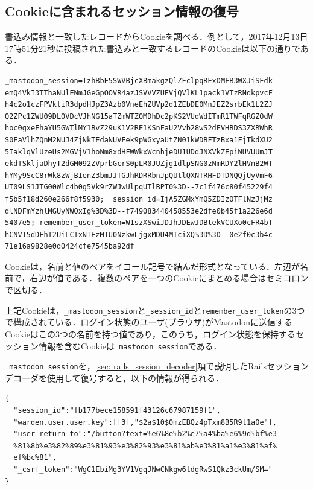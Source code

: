 \documentclass[10pt, a4paper]{jreport}
\begin{document}
\subsection{Cookieに含まれるセッション情報の復号}
書込み情報と一致したレコードからCookieを調べる．例として，2017年12月13日17時51分21秒に投稿された書込みと一致するレコードのCookieは以下の通りである．

\begin{verbatim}
_mastodon_session=TzhBbE5SWVBjcXBmakgzQlZFclpqRExDMFB3WXJiSFdk
emQ4VkI3TThaNUlENmJGeGpOOVR4azJSVVVZUFVjQVlKL1pack1VTzRNdkpvcF
h4c2o1czFPVkliR3dpdHJpZ3Azb0VneEhZUVp2d1ZEbDE0MnJEZ2srbEk1L2ZJ
Q2ZPc1ZWU09DL0VDcVJhNG15aTZmWTZQMDhDc2pKS2VUdWdITmR1TWFqRGZOdW
hoc0gxeFhaYU5GWTlMY1BvZ29uK1V2RE1KSnFaU2Vvb28wS2dFVHBDS3ZXRWhR
S0FaVlhZQnM2NUJ4ZjNkTEdaNUVFek9pWGxyaUtZN01kWDBFTzBxa1FjTkdXU2
5IaklqVlUzeUs2MGVjV1hoNm8xdHFWWkxWcnhjeDU1UDdJNXVkZEpiNUVUUmJT
ekdTSkljaDhyT2dGM092ZVprbGcrS0pLR0JUZjg1dlpSNG0zNmRDY2lHVnB2WT
hYMy9ScC8rWk8zWjBIenZ3bmJJTGJhRDRRbnJpQUtlQXNTRHFDTDNQQjUyVmF6
UT09LS1JTG00Wlc4b0g5Vk9rZWJwUlpqUTlBPT0%3D--7c1f476c80f45229f4
f5b5f18d260e266f8f5930; _session_id=IjA5ZGMxYmQ5ZDIzOTFlNzJjMz
dlNDFmYzhlMGUyNWQxIg%3D%3D--f749083440458553e2dfe0b45f1a226e6d
5407e5; remember_user_token=W1szXSwiJDJhJDEwJDBtekVCUXo0cFR4bT
hCNVI5dDFhT2UiLCIxNTEzMTU0NzkwLjgxMDU4MTciXQ%3D%3D--0e2f0c3b4c
71e16a9828e0d0424cfe7545ba92df
\end{verbatim}

Cookieは，名前と値のペアをイコール記号で結んだ形式となっている．左辺が名前で，右辺が値である．複数のペアを一つのCookieにまとめる場合はセミコロンで区切る．

上記Cookieは，\verb|_mastodon_session|と\verb|_session_id|と\verb|remember_user_token|の3つで構成されている．ログイン状態のユーザ(ブラウザ)がMastodonに送信するCookieはこの3つの名前を持つ値であり，このうち，ログイン状態を保持するセッション情報を含むCookieは\verb|_mastodon_session|である．

\verb|_mastodon_session|を，\ref{sec: rails_session_decoder}項で説明したRailsセッションデコーダを使用して復号すると，以下の情報が得られる．

\begin{verbatim}
{
  "session_id":"fb177bece158591f43126c67987159f1",
  "warden.user.user.key":[[3],"$2a$10$0mzEBQz4pTxm8B5R9t1aOe"],
  "user_return_to":"/button?text=%e6%8e%b2%e7%a4%ba%e6%9d%bf%e3
  %81%8b%e3%82%89%e3%81%93%e3%82%93%e3%81%ab%e3%81%a1%e3%81%af%
  ef%bc%81",
  "_csrf_token":"WgC1EbiMg3YV1VgqJNwCNkgw6ldgRwS1Qkz3ckUm/SM="
}
\end{verbatim}
\end{document}
